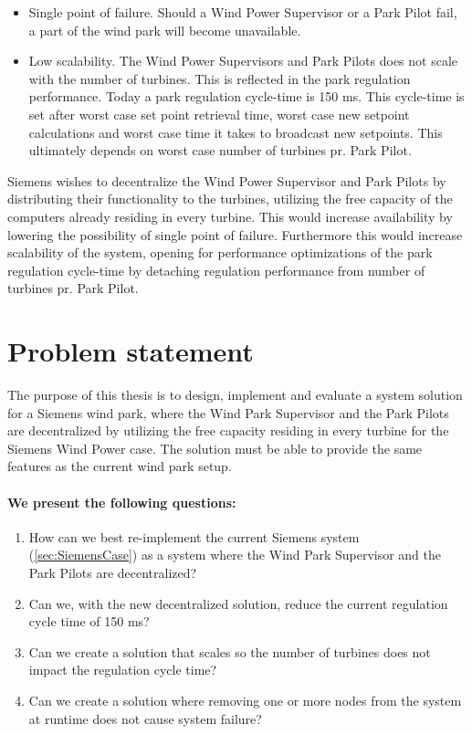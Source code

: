 \begin{itemize} 
	\item Single point of failure. Should a Wind Power Supervisor or a Park Pilot fail, a part of the wind park will become unavailable.
	\item Low scalability. The Wind Power Supervisors and Park Pilots does not scale with the number of turbines. This is reflected in the park regulation performance. Today a park regulation cycle-time is 150 ms. This cycle-time is set after worst case set point retrieval time, worst case new setpoint calculations and worst case time it takes to broadcast new setpoints. This ultimately depends on worst case number of turbines pr. Park Pilot.
\end{itemize}

Siemens wishes to decentralize the Wind Power Supervisor and Park Pilots by distributing their functionality to the turbines, utilizing the free capacity of the computers already residing in every turbine. This would increase availability by lowering the possibility of single point of failure. Furthermore this would increase scalability of the system, opening for performance optimizations of the park regulation cycle-time by detaching regulation performance from number of turbines pr. Park Pilot. 


\section{Problem statement}
\label{sec:problemStatement}

The purpose of this thesis is to design, implement and evaluate a system solution for a Siemens wind park, where the Wind Park Supervisor and the Park Pilots are decentralized by utilizing the free capacity residing in every turbine for the Siemens Wind Power case. The solution must be able to provide the same features as the current wind park setup. 

\paragraph{We present the following questions:}
\begin{enumerate} [label={\arabic*.}, ref=\textit{\arabic*}]
	\item \label{PS:Q:1} How can we best re-implement the current Siemens system (\cref{sec:SiemensCase}) as a system where the Wind Park Supervisor and the Park Pilots are decentralized?
	\item \label{PS:Q:2} Can we, with the new decentralized solution, reduce the current regulation cycle time of 150 ms?
	\item \label{PS:Q:3} Can we create a solution that scales so the number of turbines does not impact the regulation cycle time?
	\item \label{PS:Q:4} Can we create a solution where removing one or more nodes from the system at runtime does not cause system failure?
\end{enumerate}

